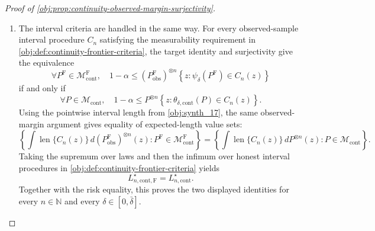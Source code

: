 \documentclass[11pt]{article}
\begin{document}
\begin{proof}[Proof of \cref{obj:prop:continuity-observed-margin-surjectivity}]
\begin{enumerate}
\item The interval criteria are handled in the same way.  For every observed-sample interval procedure \(C_n\) satisfying the measurability requirement in \cref{obj:def:continuity-frontier-criteria}, the target identity and surjectivity give the equivalence
\[
\forall P^{\mathrm F}\in\mathcal M_{\mathrm{cont}}^{\mathrm F},\quad
1-\alpha\le
(P^{\mathrm F}_{\mathrm{obs}})^{\otimes n}
\!\left\{z:\psi_\delta(P^{\mathrm F})\in C_n(z)\right\}
\]
if and only if
\[
\forall P\in\mathcal M_{\mathrm{cont}},\quad
1-\alpha\le
P^{\otimes n}
\!\left\{z:\theta_{\delta,\mathrm{cont}}(P)\in C_n(z)\right\}.
\]
Using the pointwise interval length from \cref{obj:synth_17}, the same observed-margin argument gives equality of expected-length value sets:
\[
\left\{
\int \operatorname{len}\{C_n(z)\}\,d(P^{\mathrm F}_{\mathrm{obs}})^{\otimes n}(z):
P^{\mathrm F}\in\mathcal M_{\mathrm{cont}}^{\mathrm F}
\right\}
=
\left\{
\int \operatorname{len}\{C_n(z)\}\,dP^{\otimes n}(z):
P\in\mathcal M_{\mathrm{cont}}
\right\}.
\]
Taking the supremum over laws and then the infimum over honest interval procedures in \cref{obj:def:continuity-frontier-criteria} yields
\[
L_{n,\mathrm{cont},\mathrm F}^\star
=
L_{n,\mathrm{cont}}^\star .
\]
Together with the risk equality, this proves the two displayed identities for every \(n\in\mathbb N\) and every \(\delta\in[0,\bar\delta]\). %
\end{enumerate}
\end{proof}
\end{document}
